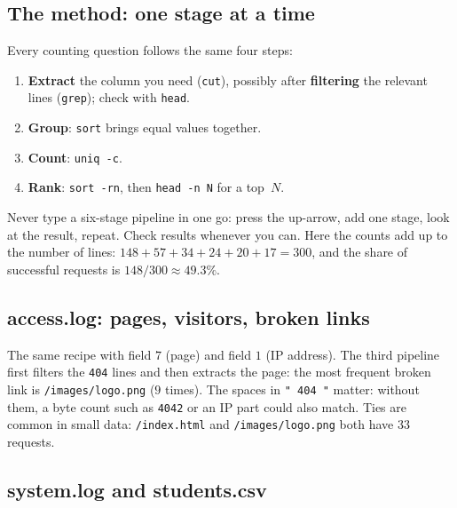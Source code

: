 \documentclass[11pt,a4paper]{article}
\newcommand{\cmd}[1]{\texttt{#1}}
\begin{document}
\subsection{The method: one stage at a time}




Every counting question follows the same four steps:
\begin{enumerate}[leftmargin=1.4em]
  \item \textbf{Extract} the column you need (\cmd{cut}), possibly after \textbf{filtering} the relevant lines (\cmd{grep}); check with \cmd{head}.
  \item \textbf{Group}: \cmd{sort} brings equal values together.
  \item \textbf{Count}: \cmd{uniq -c}.
  \item \textbf{Rank}: \cmd{sort -rn}, then \cmd{head -n N} for a top~$N$.
\end{enumerate}
Never type a six-stage pipeline in one go: press the up-arrow, add one stage, look at the result, repeat. Check results whenever you can. Here the counts add up to the number of lines: $148 + 57 + 34 + 24 + 20 + 17 = 300$, and the share of successful requests is $148/300 \approx 49.3\%$.

\subsection{access.log: pages, visitors, broken links}



The same recipe with field $7$ (page) and field $1$ (IP address). The third pipeline first filters the \texttt{404} lines and then extracts the page: the most frequent broken link is \texttt{/images/logo.png} ($9$ times). The spaces in \texttt{" 404 "} matter: without them, a byte count such as \texttt{4042} or an IP part could also match. Ties are common in small data: \texttt{/index.html} and \texttt{/images/logo.png} both have $33$ requests.

\subsection{system.log and students.csv}


\end{document}
